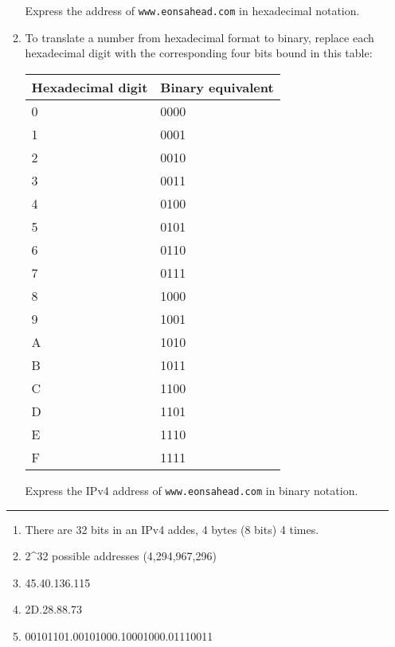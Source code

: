 \documentclass[twoside]{article}
\newenvironment{answer}
  {\vspace*{0.2cm} \rule{12cm}{0.04cm} \vspace*{0.2cm}}
  {\vspace*{0.2cm}}
\begin{document}
\begin{enumerate}
\begin{enumerate}
\begin{itemize}
      \end{itemize}

      Express the address of \verb+www.eonsahead.com+ in hexadecimal
      notation.

    \item To translate a number from hexadecimal format to binary,
      replace each hexadecimal digit with the corresponding
      four bits bound in this table:

      \begin{tabular}{l|l}
        \textbf{Hexadecimal digit} & \textbf{Binary equivalent} \\ \hline
        0 & 0000 \\
        1 & 0001 \\
        2 & 0010 \\
        3 & 0011 \\
        4 & 0100 \\
        5 & 0101 \\
        6 & 0110 \\
        7 & 0111 \\
        8 & 1000 \\
        9 & 1001 \\
        A & 1010 \\
        B & 1011 \\
        C & 1100 \\
        D & 1101 \\
        E & 1110 \\
        F & 1111 \\
        \end{tabular}

      Express the IPv4 address of \verb+www.eonsahead.com+ in binary
      notation.
 
    \end{enumerate}

  \begin{answer}

  \begin{enumerate}
    \item There are 32 bits in an IPv4 addes, 4 bytes (8 bits) 4 times.
    \item 2^32 possible addresses (4,294,967,296)
    \item 45.40.136.115
    \item 2D.28.88.73
    \item 00101101.00101000.10001000.01110011
    \end{enumerate}


\end{answer}
\end{enumerate}
\end{document}
